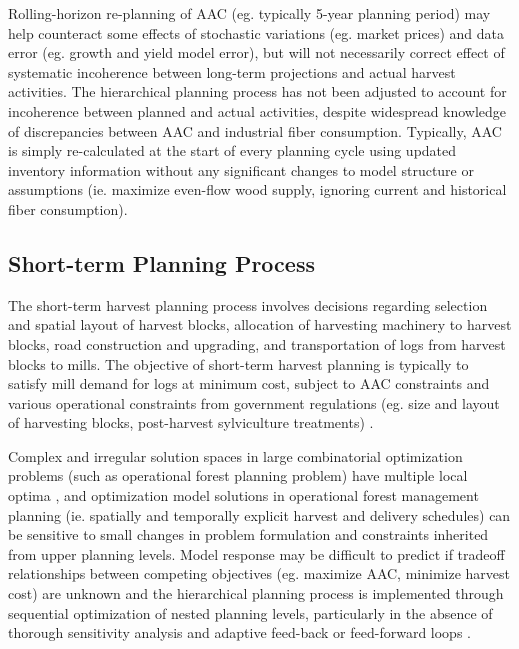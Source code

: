 Rolling-horizon re-planning of AAC (eg. typically 5-year planning
period) may help counteract some effects of stochastic variations
(eg. market prices) and data error (eg. growth and yield model error),
but will not necessarily correct effect of systematic incoherence
between long-term projections and actual harvest activities. The
hierarchical planning process has not been adjusted to account for
incoherence between planned and actual activities, despite widespread
knowledge of discrepancies between AAC and industrial fiber
consumption. Typically, AAC is simply re-calculated at the start of every
planning cycle using updated inventory information without any
significant changes to model structure or assumptions (ie. maximize
even-flow wood supply, ignoring current and historical fiber consumption).


\subsection{Short-term Planning Process}
\label{sec:operational planning efficiency}
 
The short-term harvest planning process involves decisions regarding
selection and spatial layout of harvest blocks, allocation of harvesting
machinery to harvest blocks, road construction and
upgrading, and transportation of logs from harvest blocks to
mills. The objective of short-term harvest planning is typically to
satisfy mill demand for logs at minimum cost, subject to AAC
constraints and various operational constraints from government
regulations (eg. size and layout of harvesting blocks, post-harvest
sylviculture treatments) \citep{epstein2007harvest}.

Complex and irregular solution spaces in large combinatorial
optimization problems (such as operational forest planning problem)
have multiple local optima \citep{richards2003tabu,paradis2005multi},
and optimization model solutions in operational forest management
planning (ie. spatially and temporally explicit harvest and delivery
schedules) can be sensitive to small changes in problem
formulation and constraints inherited from upper planning
levels. Model response may be difficult to predict if tradeoff
relationships between competing objectives (eg. maximize AAC, minimize
harvest cost) are unknown and the hierarchical planning process is
implemented through sequential optimization of nested planning levels,
particularly in the absence of thorough sensitivity analysis and
adaptive feed-back or feed-forward loops \citep{gunn1991some}.


